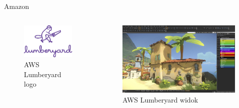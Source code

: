 \begin{frame}{Amazon}
    \begin{columns}[c]
        \begin{figure}
            \centering
            \includegraphics[height=0.40\textheight]{images/Lumberyard_Logo.png}
            \caption{AWS Lumberyard logo \cite{AWS_Lumberyard_logo}}
            \label{fig:AWS_Lumberyard}
        \end{figure}
        \begin{figure}
            \centering
            \includegraphics[height=0.60\textheight]{images/lumberyard_editor_relay_1.jpg}
            \caption{AWS Lumberyard widok \cite{AWS_Lumberyard_view}}
            \label{fig:social-media}
        \end{figure}
    \end{columns}
\end{frame}
    


